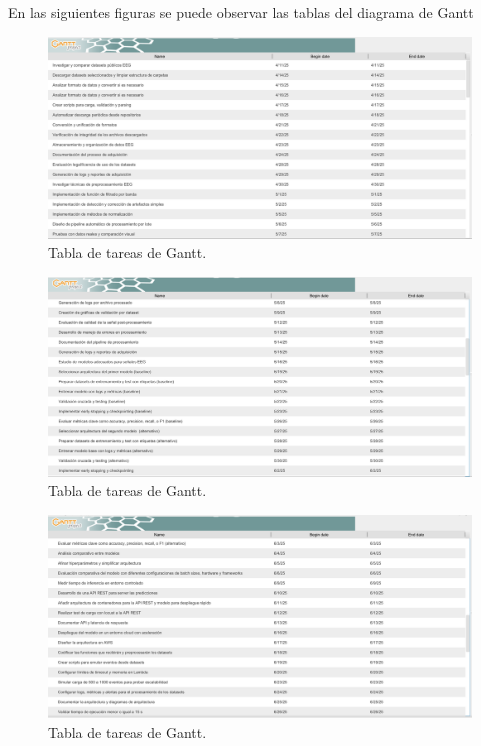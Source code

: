 \documentclass[
11pt, %
]{charter}
\begin{document}
En las siguientes figuras se puede observar las tablas del diagrama de Gantt
\begin{figure}[htpb]
\centering 
\includegraphics[width=.99\textwidth]{./Figuras/tareas-1.png}
\caption{Tabla de tareas de Gantt.}
\label{fig:diagBloques}
\end{figure}


\begin{figure}[htpb]
\centering 
\includegraphics[width=.99\textwidth]{./Figuras/tareas-2.png}
\caption{Tabla de tareas de Gantt.}
\label{fig:diagBloques}
\end{figure}

\begin{figure}[htpb]
\centering 
\includegraphics[width=.99\textwidth]{./Figuras/tareas-3.png}
\caption{Tabla de tareas de Gantt.}
\label{fig:diagBloques}
\end{figure}
\end{document}
